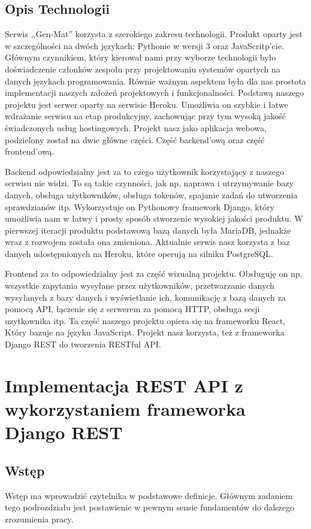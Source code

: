 \documentclass[oneside,polski,logo,indent]{amuthesis}
\begin{document}
\section{Opis Technologii}
Serwis ,,Gen-Mat'' korzysta z szerokiego zakresu technologii. Produkt oparty jest w szczególności na dwóch językach: Pythonie w wersji 3 oraz JavaScritp'cie. Głównym czynnikiem, który kierował nami przy wyborze technologii było doświadczenie członków zespołu przy projektowaniu systemów opartych na danych językach programowania. Równie ważnym aspektem była dla nas prostota implementacji naszych założeń projektowych i funkcjonalności. Podstawą naszego projektu jest serwer oparty na serwisie Heroku. Umożliwia on szybkie i łatwe wdrażanie serwisu na etap produkcyjny, zachowując przy tym wysoką jakość świadczonych usług hostingowych. Projekt nasz jako aplikacja webowa, podzielony został na dwie główne części. Część backend’ową oraz część frontend’ową.     

Backend odpowiedzialny jest za to czego użytkownik korzystający z naszego serwisu nie widzi. To są takie czynności, jak np. naprawa i utrzymywanie bazy danych, obsługa użytkowników, obsługa tokenów, spajanie zadań do utworzenia sprawdzianów itp. Wykorzystuje on Pythonowy framework Django, który umożliwia nam w łatwy i prosty sposób stworzenie wysokiej jakości produktu. W pierwszej iteracji produktu podstawową bazą danych była MariaDB, jednakże wraz z rozwojem została ona zmieniona. Aktualnie serwis nasz korzysta z baz danych udostępnionych na Heroku, które operują na silniku PostgreSQL.   

Frontend za to odpowiedzialny jest za część wizualną projektu. Obsługuję on np. wszystkie zapytania wysyłane przez użytkowników, przetwarzanie danych wysyłanych z bazy danych i wyświetlanie ich, komunikację z bazą danych za pomocą API, łączenie się z serwerem za pomocą HTTP, obsługa sesji uzytkownika itp. Ta część naszego projektu opiera się na frameworku React, Który bazuje na języku JavaScript. Projekt nasz korzysta, też z frameworka Django REST do tworzenia RESTful API.

\chapter{Implementacja REST API z wykorzystaniem frameworka Django REST}

\section{Wstęp}
Wstęp ma wprowadzić czytelnika w podstawowe definicje. Głównym zadaniem tego podrozdziału jest postawienie w pewnym sensie fundamentów do dalszego zrozumienia pracy.
\end{document}
